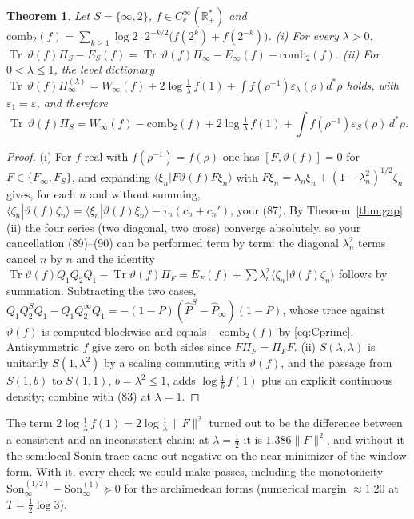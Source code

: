 \documentclass[11pt]{amsart}
\newtheorem{theorem}{Theorem}[section]
\theoremstyle{definition}
\theoremstyle{remark}
\newcommand{\R}{\mathbb R}
\newcommand{\Tr}{\operatorname{Tr}}
\newcommand{\Son}{\mathrm{Son}}
\newcommand{\Pih}{\widehat P}
\begin{document}
\begin{theorem}\label{thm:84}
Let $S=\{\infty,2\}$, $f\in C_c^\infty(\R_+^*)$ and $\mathrm{comb}_2(f)=\sum_{k\ge1}\log2\cdot2^{-k/2}\big(f(2^k)+f(2^{-k})\big)$.
\emph{(i)} For every $\lambda>0$,
$\Tr\,\vartheta(f)\Pi_S-E_S(f)=\Tr\,\vartheta(f)\Pi_\infty-E_\infty(f)-\mathrm{comb}_2(f)$.
\emph{(ii)} For $0<\lambda\le1$, the level dictionary
$\Tr\,\vartheta(f)\Pi_\infty^{(\lambda)}=W_\infty(f)+2\log\tfrac1\lambda\,f(1)+\int f(\rho^{-1})\varepsilon_\lambda(\rho)d^*\rho$ holds,
with $\varepsilon_1=\varepsilon$, and therefore
\[
\Tr\,\vartheta(f)\Pi_S=W_\infty(f)-\mathrm{comb}_2(f)+2\log\tfrac1\lambda\,f(1)+\int f(\rho^{-1})\varepsilon_S(\rho)\,d^*\rho .
\]
\end{theorem}
\begin{proof}
(i) For $f$ real with $f(\rho^{-1})=f(\rho)$ one has $[F,\vartheta(f)]=0$ for $F\in\{F_\infty,F_S\}$, and expanding
$\langle\xi_n|F\vartheta(f)F\xi_n\rangle$ with $F\xi_n=\lambda_n\xi_n+(1-\lambda_n^2)^{1/2}\zeta_n$ gives, for each $n$ and without
summing, $\langle\zeta_n|\vartheta(f)\zeta_n\rangle=\langle\xi_n|\vartheta(f)\xi_n\rangle-\tau_n(c_n+c_n')$, your (87). By
Theorem~\ref{thm:gap}(ii) the four series (two diagonal, two cross) converge absolutely, so your cancellation (89)--(90) can be
performed term by term: the diagonal $\lambda_n^2$ terms cancel $n$ by $n$ and
the identity $\Tr\vartheta(f)Q_1Q_2Q_1-\Tr\vartheta(f)\Pi_F=E_F(f)+\sum\lambda_n^2\langle\zeta_n|\vartheta(f)\zeta_n\rangle$ follows by summation.
Subtracting the two cases, $Q_1Q_2^SQ_1-Q_1Q_2^\infty Q_1=-(1-P)(\Pih^S-\Pih_\infty)(1-P)$, whose trace against $\vartheta(f)$ is
computed blockwise and equals $-\mathrm{comb}_2(f)$ by \eqref{eq:Cprime}. Antisymmetric $f$ give zero on both sides since
$F\Pi_F=\Pi_FF$. (ii) $S(\lambda,\lambda)$ is unitarily $S(1,\lambda^2)$ by a scaling commuting with $\vartheta(f)$, and the
passage from $S(1,b)$ to $S(1,1)$, $b=\lambda^2\le1$, adds $\log\frac1b\,f(1)$ plus an explicit continuous density; combine with
(83) at $\lambda=1$.
\end{proof}

The term $2\log\frac1\lambda\,f(1)=2\log\frac1\lambda\,\|F\|^2$ turned out to be the difference between a consistent and an
inconsistent chain: at $\lambda=\frac12$ it is $1.386\|F\|^2$, and without it the semilocal Sonin trace came out negative on the
near-minimizer of the window form. With it, every check we could make passes, including the monotonicity
$\Son_\infty^{(1/2)}-\Son_\infty^{(1)}\succeq0$ for the archimedean forms (numerical margin $\approx1.20$ at $T=\frac12\log3$).
\end{document}
